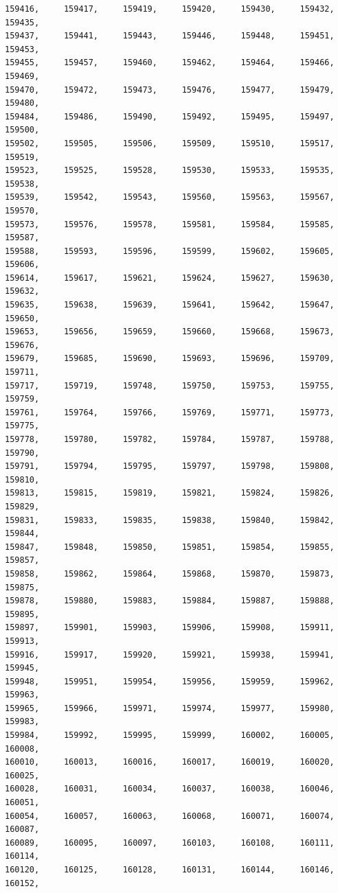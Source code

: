 \documentclass[a4paper,11pt]{report}
\begin{document}
\begin{verbatim}
159416,     159417,     159419,     159420,     159430,     159432,     159435,
159437,     159441,     159443,     159446,     159448,     159451,     159453,
159455,     159457,     159460,     159462,     159464,     159466,     159469,
159470,     159472,     159473,     159476,     159477,     159479,     159480,
159484,     159486,     159490,     159492,     159495,     159497,     159500,
159502,     159505,     159506,     159509,     159510,     159517,     159519,
159523,     159525,     159528,     159530,     159533,     159535,     159538,
159539,     159542,     159543,     159560,     159563,     159567,     159570,
159573,     159576,     159578,     159581,     159584,     159585,     159587,
159588,     159593,     159596,     159599,     159602,     159605,     159606,
159614,     159617,     159621,     159624,     159627,     159630,     159632,
159635,     159638,     159639,     159641,     159642,     159647,     159650,
159653,     159656,     159659,     159660,     159668,     159673,     159676,
159679,     159685,     159690,     159693,     159696,     159709,     159711,
159717,     159719,     159748,     159750,     159753,     159755,     159759,
159761,     159764,     159766,     159769,     159771,     159773,     159775,
159778,     159780,     159782,     159784,     159787,     159788,     159790,
159791,     159794,     159795,     159797,     159798,     159808,     159810,
159813,     159815,     159819,     159821,     159824,     159826,     159829,
159831,     159833,     159835,     159838,     159840,     159842,     159844,
159847,     159848,     159850,     159851,     159854,     159855,     159857,
159858,     159862,     159864,     159868,     159870,     159873,     159875,
159878,     159880,     159883,     159884,     159887,     159888,     159895,
159897,     159901,     159903,     159906,     159908,     159911,     159913,
159916,     159917,     159920,     159921,     159938,     159941,     159945,
159948,     159951,     159954,     159956,     159959,     159962,     159963,
159965,     159966,     159971,     159974,     159977,     159980,     159983,
159984,     159992,     159995,     159999,     160002,     160005,     160008,
160010,     160013,     160016,     160017,     160019,     160020,     160025,
160028,     160031,     160034,     160037,     160038,     160046,     160051,
160054,     160057,     160063,     160068,     160071,     160074,     160087,
160089,     160095,     160097,     160103,     160108,     160111,     160114,
160120,     160125,     160128,     160131,     160144,     160146,     160152,

\end{verbatim}
\end{document}

